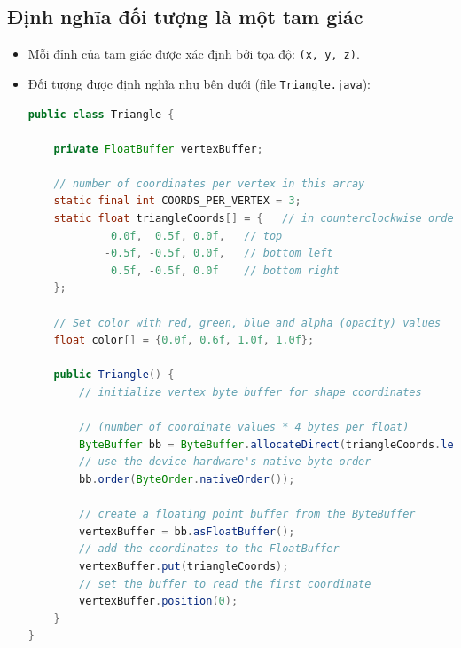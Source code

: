 \documentclass[13pt,a4paper]{extreport}
\begin{document}
\subsection{Định nghĩa đối tượng là một tam giác}
	\begin{itemize}
		\item Mỗi đỉnh của tam giác được xác định bởi tọa độ: \verb|(x, y, z)|.
		\item Đối tượng được định nghĩa như bên dưới (file \verb|Triangle.java|):
			\begin{lstlisting}[language=Java]
public class Triangle {

    private FloatBuffer vertexBuffer;

    // number of coordinates per vertex in this array
    static final int COORDS_PER_VERTEX = 3;
    static float triangleCoords[] = {   // in counterclockwise order:
             0.0f,  0.5f, 0.0f,   // top
            -0.5f, -0.5f, 0.0f,   // bottom left
             0.5f, -0.5f, 0.0f    // bottom right
    };

    // Set color with red, green, blue and alpha (opacity) values
    float color[] = {0.0f, 0.6f, 1.0f, 1.0f};

    public Triangle() {
        // initialize vertex byte buffer for shape coordinates
        
        // (number of coordinate values * 4 bytes per float)
        ByteBuffer bb = ByteBuffer.allocateDirect(triangleCoords.length*4);
        // use the device hardware's native byte order
        bb.order(ByteOrder.nativeOrder());

        // create a floating point buffer from the ByteBuffer
        vertexBuffer = bb.asFloatBuffer();
        // add the coordinates to the FloatBuffer
        vertexBuffer.put(triangleCoords);
        // set the buffer to read the first coordinate
        vertexBuffer.position(0);
    }
}
			\end{lstlisting}
	\end{itemize}
	
\end{document}
